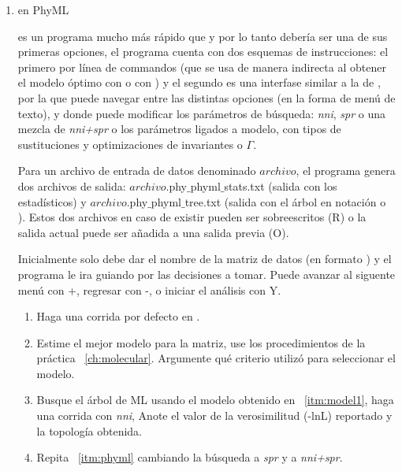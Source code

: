 \begin{enumerate}
\item{en PhyML}

 es un programa mucho m\'as r\'apido que  y  por lo tanto deber\'ia ser una de sus primeras opciones, el programa cuenta con dos esquemas de instrucciones: el primero por l\'inea de commandos (que se usa de manera indirecta al obtener el modelo \'optimo con  o con ) y el segundo es una interfase similar a la de , por la que puede navegar entre las distintas opciones (en la forma de men\'u de texto), y donde puede modificar los par\'ametros de b\'usqueda: \textit{nni}, \textit{spr} o una mezcla de \textit{nni+spr} o los par\'ametros ligados a modelo, con tipos de sustituciones y optimizaciones de invariantes o $\Gamma$.

Para un archivo de entrada de datos denominado $archivo$, el programa genera dos archivos de salida: $archivo$.phy$\_$phyml$\_$stats.txt (salida con los  estad\'isticos) y $archivo$.phy$\_$phyml$\_$tree.txt (salida con  el \'arbol en notaci\'on  o ). Estos dos archivos en caso de existir pueden ser sobreescritos (R) o la salida actual puede ser a\~nadida a una salida previa (O).

Inicialmente solo debe dar el nombre de la matriz de datos (en formato ) y el programa le ira guiando por las decisiones a tomar. Puede avanzar al siguente men\'u con +, regresar con -, o iniciar el an\'alisis con Y.

	\begin{enumerate}
		\item Haga una corrida por defecto en .
		
		
		\item \label{itm:model1} Estime el mejor modelo para la matriz, use los procedimientos de la pr\'actica ~\ref{ch:molecular}. Argumente qu\'e criterio utiliz\'o para seleccionar el modelo.
		
		\item \label{itm:phyml} Busque el \'arbol de ML usando el modelo obtenido en ~\ref{itm:model1}, haga una corrida con \textit{nni},  Anote el valor de la verosimilitud (-lnL) reportado y la topolog\'ia obtenida.
		
		\item Repita ~\ref{itm:phyml} cambiando la b\'usqueda a \textit{spr} y a \textit{nni+spr}.
		

\end{enumerate}
\end{enumerate}
